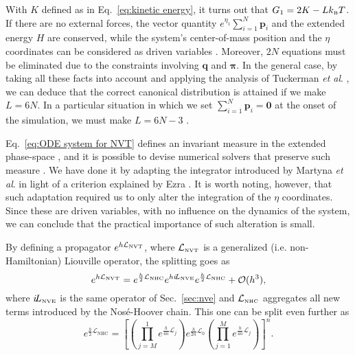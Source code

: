 \documentclass[
	aip,
	jcp,
	reprint,
]{revtex4-1}
\newcommand{\vt}[1]{\boldsymbol{\mathbf{#1}}}          %
\newcommand{\Liu}[1]{i\!L_\text{#1}}                   %
\newcommand{\timestep}{h}
\begin{document}
With $K$ defined as in Eq.~\eqref{eq:kinetic energy}, it turns out that $G_1 = 2K - L k_\text{\tiny B} T$.
If there are no external forces, the vector quantity $e^{\eta_1}\sum_{i=1}^N {\vt p}_i$ and the extended energy $H$ are conserved, while the system's center-of-mass position and the $\eta$ coordinates can be considered as driven variables \cite{Tuckerman_2001}.
Moreover, $2N$ equations must be eliminated due to the constraints involving $\vt q$ and $\vt \pi$.
In the general case, by taking all these facts into account and applying the analysis of Tuckerman \textit{et al}. \cite{Tuckerman_2001}, we can deduce that the correct canonical distribution is attained if we make $L = 6N$.
In a particular situation in which we set $\sum_{i=1}^N {\vt p}_i = \vt 0$ at the onset of the simulation, we must make $L = 6N - 3$ \cite{Martyna_1994}.

Eq.~\eqref{eq:ODE system for NVT} defines an invariant measure in the extended phase-space \cite{Tuckerman_1999}, and it is possible to devise numerical solvers that preserve such measure \cite{Sergi_2001, Ezra_2004, Ezra_2006}.
We have done it by adapting the integrator introduced by Martyna \textit{et al}. \cite{Martyna_1996} in light of a criterion explained by Ezra \cite{Ezra_2006}.
It is worth noting, however, that such adaptation required us to only alter the integration of the $\eta$ coordinates.
Since these are driven variables, with no influence on the dynamics of the system, we can conclude that the practical importance of such alteration is small.

By defining a propagator $e^{\timestep \mathcal{L}_\text{\tiny NVT}}$, where $\mathcal{L}_\text{\tiny NVT}$ is a generalized (i.e. non-Hamiltonian) Liouville operator, the splitting goes as
\begin{equation}
\label{eq:splitting NVT}
e^{\timestep \mathcal{L}_\text{\tiny NVT}} = e^{\frac{\timestep}{2} \mathcal{L}_\text{\tiny NHC}} e^{\timestep \Liu{\tiny NVE}} e^{\frac{\timestep}{2} \mathcal{L}_\text{\tiny NHC}} + \mathcal{O}(\timestep^3),
\end{equation}
where $\Liu{\tiny NVE}$ is the same operator of Sec.~\ref{sec:nve} and $\mathcal{L}_\text{\tiny NHC}$ aggregates all new terms introduced by the Nos\'e-Hoover chain.
This one can be split even further as
\begin{equation*}
e^{\frac{\timestep}{2} \mathcal{L}_\text{NHC}} = \left[ \left( \textstyle\prod\limits_{j=M}^1 e^{\frac{\timestep}{4n} \mathcal{L}_j }\right) e^{\frac{\timestep}{2n} \mathcal{L}_0 } \left(  \textstyle\prod\limits_{j=1}^M e^{\frac{\timestep}{4n} \mathcal{L}_j }\right)  \right]^n.
\end{equation*}
\end{document}
